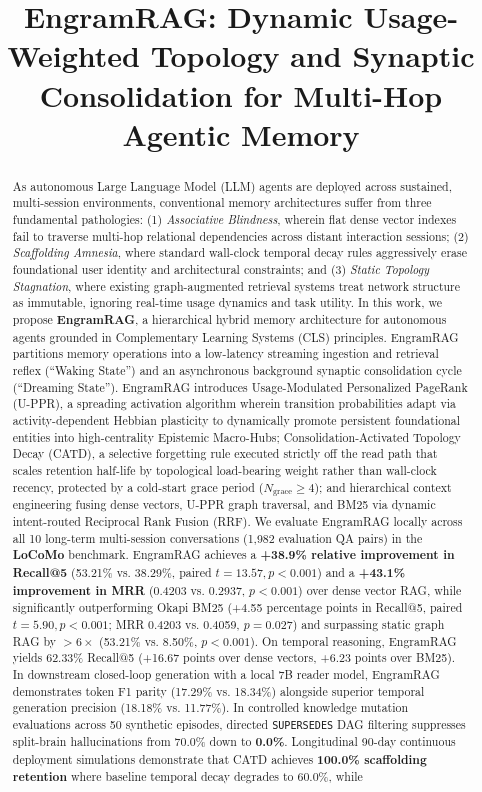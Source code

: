 \documentclass[conference]{IEEEtran}
\title{\textbf{EngramRAG: Dynamic Usage-Weighted Topology and Synaptic Consolidation for Multi-Hop Agentic Memory}}
\author{
  \IEEEauthorblockN{Bhavyateja Potineni, Lohit Giri, Anu Jain, Vadim Kutsyy, and Rajasekhar Pentakota}
  \IEEEauthorblockA{\textit{Independent Researchers}}
}
\begin{document}
\maketitle

\begin{abstract}
As autonomous Large Language Model (LLM) agents are deployed across sustained, multi-session environments, conventional memory architectures suffer from three fundamental pathologies: (1) \textit{Associative Blindness}, wherein flat dense vector indexes fail to traverse multi-hop relational dependencies across distant interaction sessions; (2) \textit{Scaffolding Amnesia}, where standard wall-clock temporal decay rules aggressively erase foundational user identity and architectural constraints; and (3) \textit{Static Topology Stagnation}, where existing graph-augmented retrieval systems treat network structure as immutable, ignoring real-time usage dynamics and task utility. In this work, we propose \textbf{EngramRAG}, a hierarchical hybrid memory architecture for autonomous agents grounded in Complementary Learning Systems (CLS) principles. EngramRAG partitions memory operations into a low-latency streaming ingestion and retrieval reflex (``Waking State'') and an asynchronous background synaptic consolidation cycle (``Dreaming State''). EngramRAG introduces Usage-Modulated Personalized PageRank (U-PPR), a spreading activation algorithm wherein transition probabilities adapt via activity-dependent Hebbian plasticity to dynamically promote persistent foundational entities into high-centrality Epistemic Macro-Hubs; Consolidation-Activated Topology Decay (CATD), a selective forgetting rule executed strictly off the read path that scales retention half-life by topological load-bearing weight rather than wall-clock recency, protected by a cold-start grace period ($N_{\text{grace}} \ge 4$); and hierarchical context engineering fusing dense vectors, U-PPR graph traversal, and BM25 via dynamic intent-routed Reciprocal Rank Fusion (RRF). We evaluate EngramRAG locally across all 10 long-term multi-session conversations (1,982 evaluation QA pairs) in the \textbf{LoCoMo} benchmark. EngramRAG achieves a \textbf{+38.9\% relative improvement in Recall@5} (53.21\% vs. 38.29\%, paired $t=13.57, p < 0.001$) and a \textbf{+43.1\% improvement in MRR} (0.4203 vs. 0.2937, $p < 0.001$) over dense vector RAG, while significantly outperforming Okapi BM25 (+4.55 percentage points in Recall@5, paired $t=5.90, p < 0.001$; MRR 0.4203 vs. 0.4059, $p = 0.027$) and surpassing static graph RAG by $>6\times$ (53.21\% vs. 8.50\%, $p < 0.001$). On temporal reasoning, EngramRAG yields 62.33\% Recall@5 (+16.67 points over dense vectors, +6.23 points over BM25). In downstream closed-loop generation with a local 7B reader model, EngramRAG demonstrates token F1 parity (17.29\% vs. 18.34\%) alongside superior temporal generation precision (18.18\% vs. 11.77\%). In controlled knowledge mutation evaluations across 50 synthetic episodes, directed \texttt{SUPERSEDES} DAG filtering suppresses split-brain hallucinations from 70.0\% down to \textbf{0.0\%}. Longitudinal 90-day continuous deployment simulations demonstrate that CATD achieves \textbf{100.0\% scaffolding retention} where baseline temporal decay degrades to 60.0\%, while 
\end{abstract}
\end{document}
